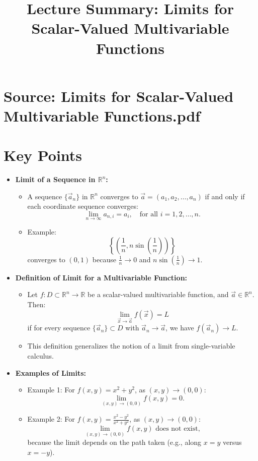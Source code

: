 \documentclass{article}
\title{Lecture Summary: Limits for Scalar-Valued Multivariable Functions}
\author{}
\date{}
\begin{document}
\maketitle

\section*{Source: Limits for Scalar-Valued Multivariable Functions.pdf}

\section*{Key Points}

\begin{itemize}
  \item \textbf{Limit of a Sequence in $\mathbb{R}^n$:}
    \begin{itemize}
      \item A sequence $\{\vec{a}_n\}$ in $\mathbb{R}^n$ converges to $\vec{a} = (a_1, a_2, \dots, a_n)$ if and only if each coordinate sequence converges:
        \[
          \lim_{n \to \infty} a_{n,i} = a_i, \quad \text{for all } i = 1, 2, \dots, n.
        \]
      \item Example:
        \[
          \left\{\left(\frac{1}{n}, n\sin\left(\frac{1}{n}\right)\right)\right\}
        \]
        converges to $(0, 1)$ because $\frac{1}{n} \to 0$ and $n\sin\left(\frac{1}{n}\right) \to 1$.
    \end{itemize}

  \item \textbf{Definition of Limit for a Multivariable Function:}
    \begin{itemize}
      \item Let $f: D \subset \mathbb{R}^n \to \mathbb{R}$ be a scalar-valued multivariable function, and $\vec{a} \in \mathbb{R}^n$. Then:
        \[
          \lim_{\vec{x} \to \vec{a}} f(\vec{x}) = L
        \]
        if for every sequence $\{\vec{a}_n\} \subset D$ with $\vec{a}_n \to \vec{a}$, we have $f(\vec{a}_n) \to L$.
      \item This definition generalizes the notion of a limit from single-variable calculus.
    \end{itemize}

  \item \textbf{Examples of Limits:}
    \begin{itemize}
      \item Example 1: For $f(x, y) = x^2 + y^2$, as $(x, y) \to (0, 0)$:
        \[
          \lim_{(x, y) \to (0, 0)} f(x, y) = 0.
        \]
      \item Example 2: For $f(x, y) = \frac{x^2 - y^2}{x^2 + y^2}$, as $(x, y) \to (0, 0)$:
        \[
          \lim_{(x, y) \to (0, 0)} f(x, y) \text{ does not exist},
        \]
        because the limit depends on the path taken (e.g., along $x = y$ versus $x = -y$).
    \end{itemize}


\end{itemize}
\end{document}
